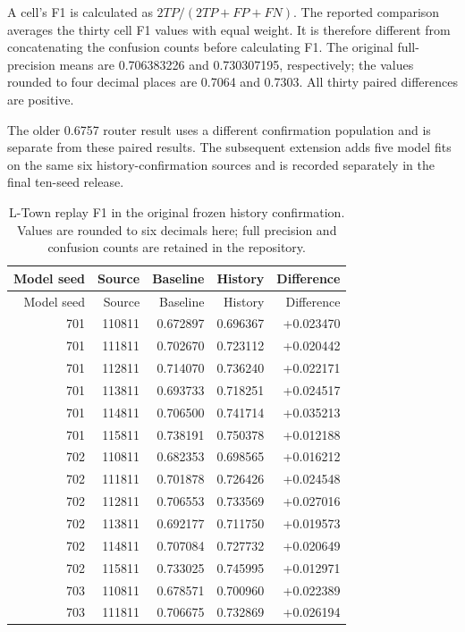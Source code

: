 A cell's F1 is calculated as $2TP/(2TP+FP+FN)$. The reported comparison averages the thirty cell F1 values with equal weight. It is therefore different from concatenating the confusion counts before calculating F1. The original full-precision means are 0.706383226 and 0.730307195, respectively; the values rounded to four decimal places are 0.7064 and 0.7303. All thirty paired differences are positive.

The older 0.6757 router result uses a different confirmation population and is separate from these paired results. The subsequent extension adds five model fits on the same six history-confirmation sources and is recorded separately in the final ten-seed release.

\begin{longtable}{@{}rrrrr@{}}
\caption[Original thirty replay confirmation pairs]{L-Town replay F1 in the original frozen history confirmation. Values are rounded to six decimals here; full precision and confusion counts are retained in the repository.}\label{tab:historypairs}\\
\toprule Model seed & Source & Baseline & History & Difference\\\midrule\endfirsthead
\toprule Model seed & Source & Baseline & History & Difference\\\midrule\endhead
701 & 110811 & 0.672897 & 0.696367 & +0.023470\\
701 & 111811 & 0.702670 & 0.723112 & +0.020442\\
701 & 112811 & 0.714070 & 0.736240 & +0.022171\\
701 & 113811 & 0.693733 & 0.718251 & +0.024517\\
701 & 114811 & 0.706500 & 0.741714 & +0.035213\\
701 & 115811 & 0.738191 & 0.750378 & +0.012188\\
702 & 110811 & 0.682353 & 0.698565 & +0.016212\\
702 & 111811 & 0.701878 & 0.726426 & +0.024548\\
702 & 112811 & 0.706553 & 0.733569 & +0.027016\\
702 & 113811 & 0.692177 & 0.711750 & +0.019573\\
702 & 114811 & 0.707084 & 0.727732 & +0.020649\\
702 & 115811 & 0.733025 & 0.745995 & +0.012971\\
703 & 110811 & 0.678571 & 0.700960 & +0.022389\\
703 & 111811 & 0.706675 & 0.732869 & +0.026194\\

\end{longtable}
